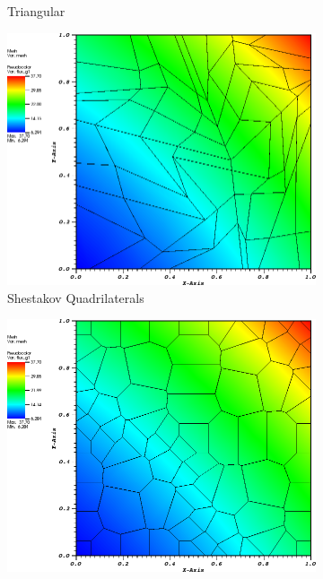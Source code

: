 \begin{figure}
{\begin{subfigure}[b]{0.465\textwidth}
		\caption{Triangular}
	\end{subfigure}
}
{
	\vspace{3mm}
	\begin{subfigure}[b]{0.465\textwidth}
		\centering
		\label{subfig::shes_quad_me_k2_lin_sol}
		\includegraphics[width=\textwidth]{figures/sec_BF/quad_sol_shesquad.png}
		\caption{Shestakov Quadrilaterals}
	\end{subfigure}
	\hfill
	\begin{subfigure}[b]{0.465\textwidth}
		\centering
		\label{subfig::smooth_poly_me_k2_lin_sol}
		\includegraphics[width=\textwidth]{figures/sec_BF/quad_sol_sinepoly.png}

\end{subfigure}}
\end{figure}
